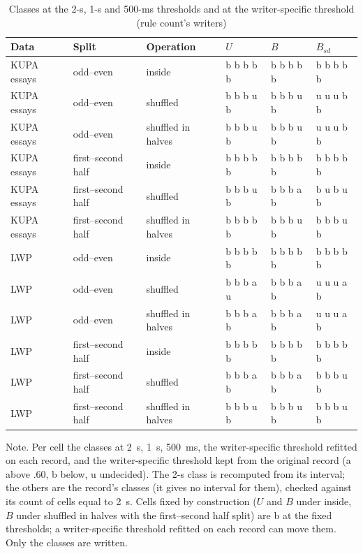 \begin{table}[htbp]
\caption{Classes at the 2-s, 1-s and 500-ms thresholds and at the writer-specific threshold (rule count's writers)}
\label{tab:thr}
\footnotesize
\begin{tabularx}{\linewidth}{@{}lllXXX@{}}
\toprule
Data & Split & Operation & $U$ & $B$ & $B_{sd}$ \\
\midrule
KUPA essays & odd--even & inside & b b b b b & b b b b b & b b b b b \\
KUPA essays & odd--even & shuffled & b b b u b & b b b u b & u u u b b \\
KUPA essays & odd--even & shuffled in halves & b b b u b & b b b u b & u u u b b \\
KUPA essays & first--second half & inside & b b b b b & b b b b b & b b b b b \\
KUPA essays & first--second half & shuffled & b b b u b & b b b a b & b u b u b \\
KUPA essays & first--second half & shuffled in halves & b b b b b & b b b u b & b b b u b \\
LWP & odd--even & inside & b b b b b & b b b b b & b b b b b \\
LWP & odd--even & shuffled & b b b a u & b b b a b & u u u a b \\
LWP & odd--even & shuffled in halves & b b b a b & b b b a b & u u u a b \\
LWP & first--second half & inside & b b b b b & b b b b b & b b b b b \\
LWP & first--second half & shuffled & b b b a b & b b b a b & b b b u b \\
LWP & first--second half & shuffled in halves & b b b u b & b b b u b & b b b u b \\
\bottomrule
\end{tabularx}
\par\smallskip\footnotesize Note. Per cell the classes at 2~s, 1~s, 500~ms, the writer-specific threshold refitted on each record, and the writer-specific threshold kept from the original record (a above .60, b below, u undecided). The 2-s class is recomputed from its interval; the others are the record's classes (it gives no interval for them), checked against its count of cells equal to 2~s. Cells fixed by construction ($U$ and $B$ under inside, $B$ under shuffled in halves with the first--second half split) are b at the fixed thresholds; a writer-specific threshold refitted on each record can move them. Only the classes are written.
\end{table}
